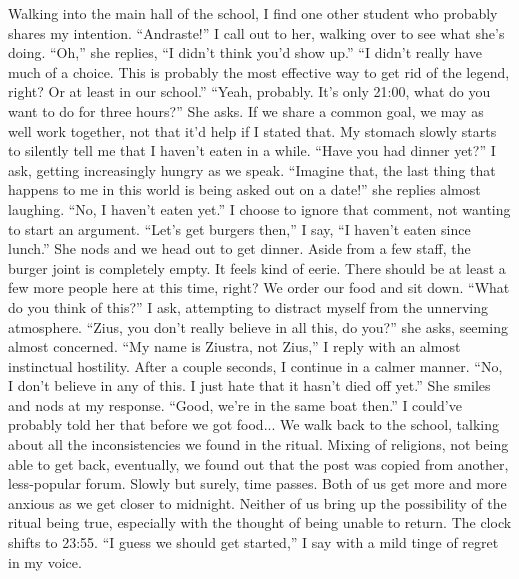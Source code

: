 \documentclass[a4paper, 12pt]{book}
\newcommand\tab[1][1cm]{\hspace*{#1}}
\begin{document}
\newline
\tab
Walking into the main hall of the school, I find one other student who probably shares my intention. ``Andraste!'' I call out to her, walking over to see what she’s doing.
\newline
\tab
``Oh,'' she replies, ``I didn’t think you’d show up.''
\newline
\tab
``I didn’t really have much of a choice. This is probably the most effective way to get rid of the legend, right? Or at least in our school.''
\newline
\tab
``Yeah, probably. It’s only 21:00, what do you want to do for three hours?'' She asks. If we share a common goal, we may as well work together, not that it’d help if I stated that. My stomach slowly starts to silently tell me that I haven’t eaten in a while.
\newline
\tab
``Have you had dinner yet?'' I ask, getting increasingly hungry as we speak.
\newline
\tab
``Imagine that, the last thing that happens to me in this world is being asked out on a date!'' she replies almost laughing. ``No, I haven’t eaten yet.'' 
\newline
\tab
I choose to ignore that comment, not wanting to start an argument. ``Let’s get burgers then,'' I say, ``I haven’t eaten since lunch.'' She nods and we head out to get dinner. Aside from a few staff, the burger joint is completely empty. It feels kind of eerie. There should be at least a few more people here at this time, right? We order our food and sit down. ``What do you think of this?'' I ask, attempting to distract myself from the unnerving atmosphere.
\newline
\tab
``Zius, you don’t really believe in all this, do you?'' she asks, seeming almost concerned.
\newline
\tab
``My name is Ziustra, not Zius,'' I reply with an almost instinctual hostility. After a couple seconds, I continue in a calmer manner. ``No, I don’t believe in any of this. I just hate that it hasn’t died off yet.''
\newline
\tab
She smiles and nods at my response. ``Good, we’re in the same boat then.'' I could’ve probably told her that before we got food...
\newline
\tab
We walk back to the school, talking about all the inconsistencies we found in the ritual. Mixing of religions, not being able to get back, eventually, we found out that the post was copied from another, less-popular forum. Slowly but surely, time passes. Both of us get more and more anxious as we get closer to midnight. Neither of us bring up the possibility of the ritual being true, especially with the thought of being unable to return. The clock shifts to 23:55. ``I guess we should get started,'' I say with a mild tinge of regret in my voice.
\end{document}
